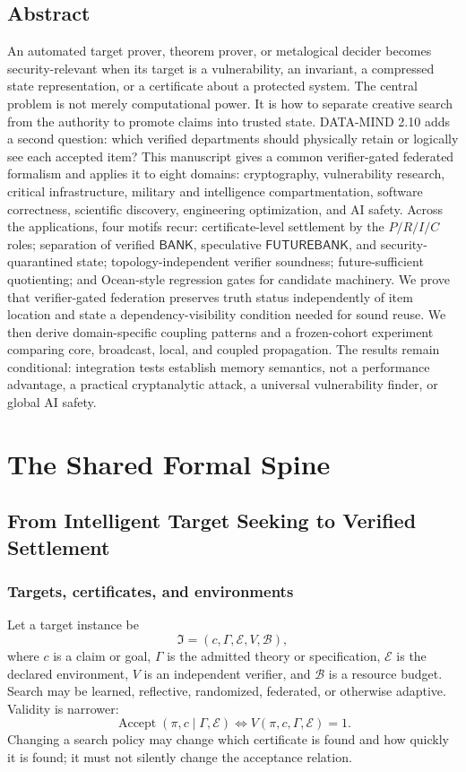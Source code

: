 \documentclass[11pt,oneside]{book}
\theoremstyle{definition}
\theoremstyle{remark}
\newcommand{\BANK}{\mathsf{BANK}}
\newcommand{\FB}{\mathsf{FUTUREBANK}}
\begin{document}
\chapter*{Abstract}
An automated target prover, theorem prover, or metalogical decider becomes security-relevant when
its target is a vulnerability, an invariant, a compressed state representation, or a certificate about
a protected system. The central problem is not merely computational power. It is how to separate
creative search from the authority to promote claims into trusted state. DATA-MIND 2.10 adds a
second question: which verified departments should physically retain or logically see each accepted
item? This manuscript gives a common verifier-gated federated formalism and applies it to eight domains: cryptography, vulnerability
research, critical infrastructure, military and intelligence compartmentation, software correctness,
scientific discovery, engineering optimization, and AI safety. Across the applications, four motifs
recur: certificate-level settlement by the $P/R/I/C$ roles; separation of verified \(\BANK\),
speculative \(\FB\), and security-quarantined state; topology-independent verifier soundness;
future-sufficient quotienting; and Ocean-style regression gates for candidate machinery. We prove
that verifier-gated federation preserves truth status independently of item location and state a
dependency-visibility condition needed for sound reuse. We then derive domain-specific coupling
patterns and a frozen-cohort experiment comparing core, broadcast, local, and coupled propagation.
The results remain conditional: integration tests establish memory semantics, not a performance
advantage, a practical cryptanalytic attack, a universal vulnerability finder, or global AI safety.

\tableofcontents

\mainmatter
\part{The Shared Formal Spine}

\chapter{From Intelligent Target Seeking to Verified Settlement}
\label{ch:spine}

\section{Targets, certificates, and environments}
Let a target instance be
\[
\mathfrak I=(c,\Gamma,\mathcal E,V,\mathcal B),
\]
where \(c\) is a claim or goal, \(\Gamma\) is the admitted theory or specification,
\(\mathcal E\) is the declared environment, \(V\) is an independent verifier, and
\(\mathcal B\) is a resource budget. Search may be learned, reflective, randomized, federated, or
otherwise adaptive. Validity is narrower:
\[
\operatorname{Accept}(\pi,c\mid\Gamma,\mathcal E)
\iff V(\pi,c,\Gamma,\mathcal E)=1.
\]
Changing a search policy may change which certificate is found and how quickly it is found; it must
not silently change the acceptance relation.
\end{document}
